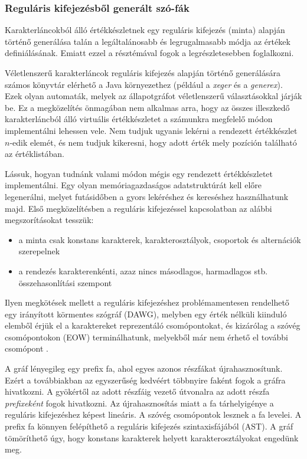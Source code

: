\documentclass[
    parspace,
    noindent,
    nohyp,
]{elteiktdk}[2023/04/10]
\begin{document}
\subsubsection{Reguláris kifejezésből generált szó-fák}

Karakterláncokból álló értékkészletnek egy reguláris kifejezés (minta)
alapján történő generálása talán a legáltalánosabb és legrugalmasabb módja
az értékek definiálásának.
Emiatt ezzel a résztémával fogok a legrészletesebben foglalkozni.

Véletlenszerű karakterláncok reguláris kifejezés alapján történő generálására
számos könyvtár elérhető a Java környezethez
(például a \textit{xeger}\cite{SoftwareXeger}
és a \textit{generex}\cite{SoftwareGenerex}).
Ezek olyan automaták, melyek az állapotgráfot véletlenszerű választásokkal járják be.
Ez a megközelítés önmagában nem alkalmas arra,
hogy az összes illeszkedő karakterláncból álló virtuális értékkészletet
a számunkra megfelelő módon implementálni lehessen vele.
Nem tudjuk ugyanis lekérni a rendezett értékkészlet $n$-edik elemét,
és nem tudjuk kikeresni, hogy adott érték mely pozíción található az értéklistában.

Lássuk, hogyan tudnánk valami módon mégis egy rendezett értékkészletet implementálni.
Egy olyan memóriagazdaságos adatstruktúrát kell előre legenerálni,
melyet futásidőben a gyors lekéréshez és kereséshez használhatunk majd.
Első megközelítésben a reguláris kifejezéssel kapcsolatban az alábbi megszorításokat tesszük:

\begin{itemize}
    \item a minta csak konstans karakterek, karakterosztályok, csoportok és alternációk szerepelnek
    \item a rendezés karakterenkénti, azaz nincs másodlagos, harmadlagos stb. összehasonlítási szempont
\end{itemize}

Ilyen megkötések mellett a reguláris kifejezéshez problémamentesen rendelhető egy
irányított körmentes szógráf (DAWG),
melyben egy érték nélküli kiinduló elemből érjük el a karaktereket reprezentáló csomópontokat,
és kizárólag a szóvég csomópontokon (EOW) terminálhatunk,
melyekből már nem érhető el további csomópont%
\cite{AppelScrabble1988}.

A gráf lényegileg egy prefix fa, ahol egyes azonos részfákat újrahasznosítunk.
Ezért a továbbiakban az egyszerűség kedvéért többnyire faként fogok a gráfra hivatkozni.
A gyökértől az adott részfáig vezető útvonalra
az adott részfa \textit{prefixeként} fogok hivatkozni.
Az újrahasznosítás miatt a fa tárhelyigénye a reguláris kifejezéshez képest lineáris.
A szóvég csomópontok lesznek a fa levelei.
A prefix fa könnyen felépíthető a reguláris kifejezés szintaxisfájából (AST).
A gráf tömöríthető úgy, hogy konstans karakterek helyett karakterosztályokat engedünk meg.
\end{document}
